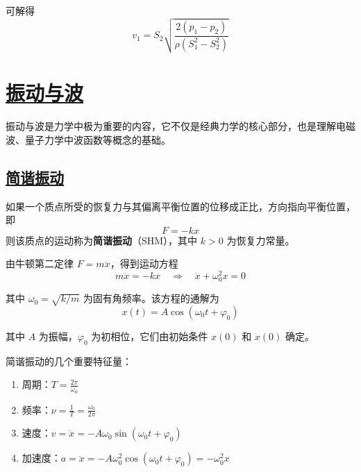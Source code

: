 可解得
\begin{equation}
    v_1 = S_2\sqrt{\frac{2(p_1 - p_2)}{\rho(S_1^2 - S_2^2)}}
\end{equation}


\newpage
\section{\protect\hyperlink{:}{振动与波}}

振动与波是力学中极为重要的内容，它不仅是经典力学的核心部分，也是理解电磁波、量子力学中波函数等概念的基础。

\subsection{\protect\hyperlink{:}{简谐振动}}

\begin{definition}[简谐振动]
    如果一个质点所受的恢复力与其偏离平衡位置的位移成正比，方向指向平衡位置，即
    \begin{equation}
        F = -kx
    \end{equation}
    则该质点的运动称为\textbf{简谐振动}（SHM），其中 $k > 0$ 为恢复力常量。
\end{definition}

由牛顿第二定律 $F = m\ddot{x}$，得到运动方程
\begin{equation}
    m\ddot{x} = -kx \quad \Longrightarrow \quad \ddot{x} + \omega_0^2 x = 0
\end{equation}

其中 $\omega_0 = \sqrt{k/m}$ 为固有角频率。该方程的通解为
\begin{equation}
    x(t) = A\cos(\omega_0 t + \varphi_0)
\end{equation}

其中 $A$ 为振幅，$\varphi_0$ 为初相位，它们由初始条件 $x(0)$ 和 $\dot{x}(0)$ 确定。

简谐振动的几个重要特征量：
\begin{enumerate}
    \item 周期：$\displaystyle T = \frac{2\pi}{\omega_0}$
    \item 频率：$\displaystyle \nu = \frac{1}{T} = \frac{\omega_0}{2\pi}$
    \item 速度：$\displaystyle v = \dot{x} = -A\omega_0\sin(\omega_0 t + \varphi_0)$
    \item 加速度：$\displaystyle a = \ddot{x} = -A\omega_0^2\cos(\omega_0 t + \varphi_0) = -\omega_0^2 x$
\end{enumerate}

